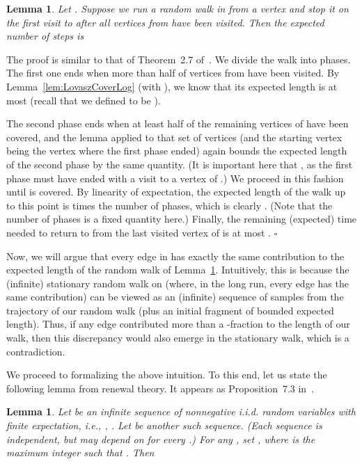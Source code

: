 \documentclass[11pt, letterpaper]{article}
\newtheorem{lemma}[theorem]{Lemma}
\newenvironment{proof}{\noindent{\bf Proof:}\hspace*{1em}}{\qed\bigskip}
\newcommand{\qed}{\hfill\ensuremath{\square}}
\begin{document}
\begin{lemma} \label{lem:preUltimate}
Let . Suppose we run a random walk in  from a vertex  and stop it on the first visit to  after all vertices from  have been visited. Then the expected number of steps is 
\end{lemma}
\begin{proof}
The proof is similar to that of Theorem~2.7 of~\cite{Lovasz93}. We divide the walk into phases. The first one ends when more than half of vertices from  have been visited. By Lemma~\ref{lem:LovaszCoverLog} (with ), we know that its expected length is at most  
(recall that we defined  to be ).

The second phase ends when at least half of the remaining vertices of  have been covered, and the lemma applied to that set of vertices (and the starting vertex  being the vertex where the first phase ended) again bounds the expected length of the second phase by the same quantity. (It is important here that , as the first phase must have ended with a visit to a vertex of .) We proceed in this fashion until  is covered. By linearity of expectation, the expected length of the walk up to this point is  times the number of phases, which is clearly . (Note that the number of phases is a fixed quantity here.) Finally, the remaining (expected) time needed to return to  from the last visited vertex of  is at most .
\end{proof}

Now, we will argue that every edge in  has exactly the same contribution to the expected length of the random walk of Lemma~\ref{lem:preUltimate}. Intuitively, this is because the (infinite) stationary random walk on  (where, in the long run, every edge has the same contribution) can be viewed as an (infinite) sequence of samples from the trajectory of our random walk (plus an initial fragment of bounded expected length). Thus, if any edge contributed more than a -fraction to the length of our walk, then this discrepancy would also emerge in the stationary walk, which is a contradiction.

We proceed to formalizing the above intuition. To this end, let us state the following lemma from renewal theory. It appears as Proposition~7.3 in~\cite{Ross09}.
\begin{lemma} \label{lem:renewal_theory}
Let  be an infinite sequence of nonnegative i.i.d. random variables with finite expectation, i.e., , . Let  be another such sequence. (Each sequence is independent, but  may depend on  for every .) For any , set , where  is the maximum integer such that . Then

\end{lemma}
\end{document}
